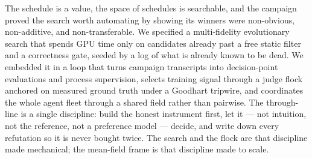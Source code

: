 \documentclass[11pt]{article}
\begin{document}
The schedule is a value, the space of schedules is searchable, and the campaign proved the search worth
automating by showing its winners were non-obvious, non-additive, and non-transferable. We specified a
multi-fidelity evolutionary search that spends GPU time only on candidates already past a free static filter
and a correctness gate, seeded by a log of what is already known to be dead. We embedded it in a loop that
turns campaign transcripts into decision-point evaluations and process supervision, selects training signal
through a judge flock anchored on measured ground truth under a Goodhart tripwire, and coordinates the whole
agent fleet through a shared field rather than pairwise. The through-line is a single discipline: build the
honest instrument first, let it --- not intuition, not the reference, not a preference model --- decide, and
write down every refutation so it is never bought twice. The search and the flock are that discipline made
mechanical; the mean-field frame is that discipline made to scale.
\end{document}
